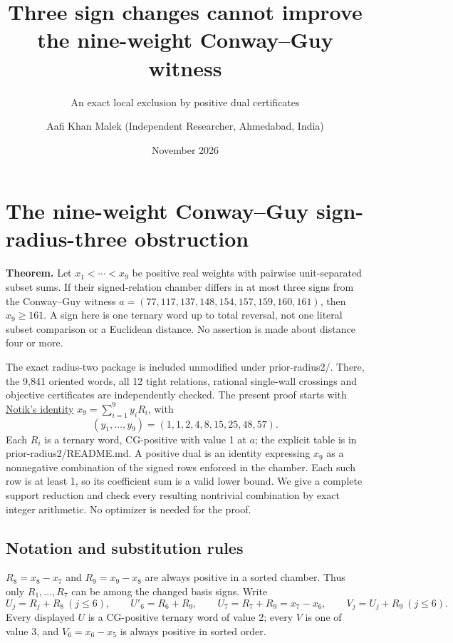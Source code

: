 \documentclass[
  11pt,
]{article}
\title{Three sign changes cannot improve the nine-weight Conway--Guy
witness}
\subtitle{An exact local exclusion by positive dual certificates}
\author{Aafi Khan Malek (Independent Researcher, Ahmedabad, India)}
\date{November 2026}
\begin{document}
\maketitle

\section{The nine-weight Conway--Guy sign-radius-three
obstruction}\label{the-nine-weight-conwayguy-sign-radius-three-obstruction}

\textbf{Theorem.} Let \(x_1<\cdots<x_9\) be positive real weights with
pairwise unit-separated subset sums. If their signed-relation chamber
differs in at most three signs from the Conway--Guy witness
\(a=(77,117,137,148,154,157,159,160,161)\), then \(x_9\ge161\). A sign
here is one ternary word up to total reversal, not one literal subset
comparison or a Euclidean distance. No assertion is made about distance
four or more.

The exact radius-two package is included unmodified under
prior-radius2/. There, the 9,841 oriented words, all 12 tight relations,
rational single-wall crossings and objective certificates are
independently checked. The present proof starts with
\href{https://arxiv.org/abs/2611.17360}{Notik's identity}
\(x_9=\sum_{i=1}^9y_iR_i\), with \[
(y_1,\ldots,y_9)=(1,1,2,4,8,15,25,48,57).
\] Each \(R_i\) is a ternary word, CG-positive with value 1 at \(a\);
the explicit table is in prior-radius2/README.md. A positive dual is an
identity expressing \(x_9\) as a nonnegative combination of the signed
rows enforced in the chamber. Each such row is at least 1, so its
coefficient sum is a valid lower bound. We give a complete support
reduction and check every resulting nontrivial combination by exact
integer arithmetic. No optimizer is needed for the proof.

\subsection{Notation and substitution
rules}\label{notation-and-substitution-rules}

\(R_8=x_8-x_7\) and \(R_9=x_9-x_8\) are always positive in a sorted
chamber. Thus only \(R_1,\ldots,R_7\) can be among the changed basis
signs. Write \[
 U_j=R_j+R_8\ (j\le6),\qquad U'_6=R_6+R_9,\qquad
 U_7=R_7+R_9=x_7-x_6,\qquad V_j=U_j+R_9\ (j\le6).
\] Every displayed \(U\) is a CG-positive ternary word of value 2; every
\(V\) is one of value 3, and \(V_6=x_6-x_5\) is always positive in
sorted order.
\end{document}
